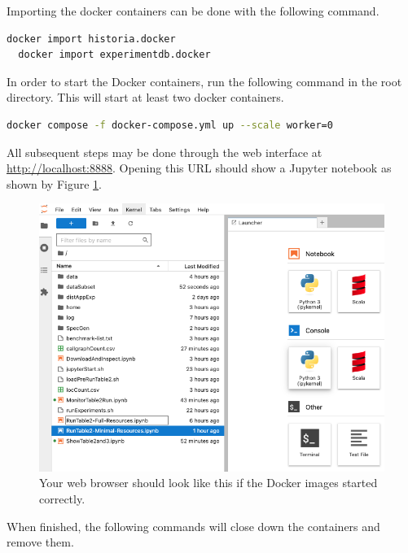 \documentclass{acmart} %
\begin{document}
Importing the docker containers can be done with the following command.

\begin{lstlisting}[language=bash]
  docker import historia.docker
  docker import experimentdb.docker
\end{lstlisting}

In order to start the Docker containers, run the following command in the root directory.  This will start at least two docker containers.%

\begin{lstlisting}[language=bash]
 docker compose -f docker-compose.yml up --scale worker=0
\end{lstlisting}

All subsequent steps may be done through the web interface at \url{http://localhost:8888}.  Opening this URL should show a Jupyter notebook as shown by Figure \ref{fig:jupyter}.  


\begin{figure}[H]
    \includegraphics*[scale=0.35]{jupyter.png}
    \caption{Your web browser should look like this if the Docker images started correctly.}
    \label{fig:jupyter}
\end{figure}

When finished, the following commands will close down the containers and remove them.
\end{document}
